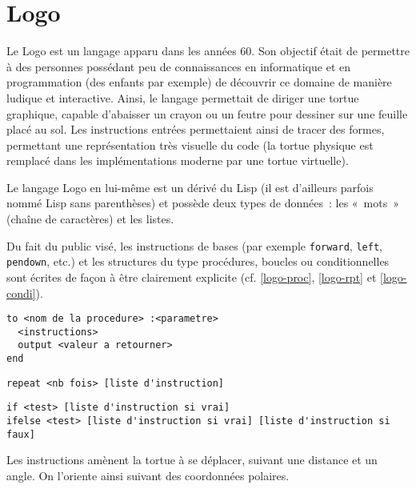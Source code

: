 \section{Logo}
\label{Logo}

Le Logo est un langage apparu dans les années 60. Son objectif était de permettre à des personnes possédant peu de connaissances en informatique et en programmation (des enfants par exemple) de découvrir ce domaine de manière ludique et interactive. Ainsi, le langage permettait de diriger une tortue graphique, capable d'abaisser un crayon ou un feutre pour dessiner sur une feuille placé au sol. Les instructions entrées permettaient ainsi de tracer des formes, permettant une représentation très visuelle du code (la tortue physique est remplacé dans les implémentations moderne par une tortue virtuelle).

Le langage Logo en lui-même est un dérivé du Lisp (il est d'ailleurs parfois nommé Lisp sans parenthèses) et possède deux types de données~: les «~mots~» (chaîne de caractères) et les listes.

Du fait du public visé, les instructions de bases (par exemple \verb|forward|, \verb|left|, \verb|pendown|, etc.) et les structures du type procédures, boucles ou conditionnelles sont écrites de façon à être clairement explicite (cf. \ref{logo-proc}, \ref{logo-rpt} et \ref{logo-condi}).

\begin{lstlisting}[language=Stibbons,label=logo-proc,caption=Procédure en Logo]
to <nom de la procedure> :<parametre>
  <instructions>
  output <valeur a retourner>
end
\end{lstlisting}

\begin{lstlisting}[language=Stibbons,label=logo-rpt,caption=Boucle en Logo]
repeat <nb fois> [liste d'instruction]
\end{lstlisting}

\begin{lstlisting}[language=Stibbons,label=logo-condi,caption=Conditionnelles en Logo]
if <test> [liste d'instruction si vrai]
ifelse <test> [liste d'instruction si vrai] [liste d'instruction si faux]
\end{lstlisting}

Les instructions amènent la tortue à se déplacer, suivant une distance et un angle. On l'oriente ainsi suivant des coordonnées polaires.
